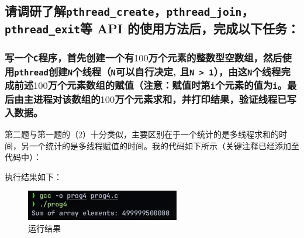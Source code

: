 \subsection{
    请调研了解{\tt pthread_create}，{\tt pthread_join}，{\tt pthread_exit}等 API 的使用方法后，完成以下任务：
}

\subsubsection{
    写一个{\tt C}程序，首先创建一个有$100$万个元素的整数型空数组，然后使用{\tt pthread}创建{\tt N}个线程（{\tt N}可以自行决定, 且{\tt N > 1}），由这{\tt N}个线程完成前述$100$万个元素数组的赋值（注意：赋值时第{\tt i}个元素的值为{\tt i}。最后由主进程对该数组的$100$万个元素求和，并打印结果，验证线程已写入数据。
}

第二题与第一题的（2）十分类似，主要区别在于一个统计的是多线程求和的时间，另一个统计的是多线程赋值的时间。我的代码如下所示（关键注释已经添加至代码中）：



执行结果如下：

\begin{figure}[H]
    \centering
    \includegraphics[width=0.6\textwidth]{fig/prog4.png}
    \caption{运行结果}
\end{figure}
